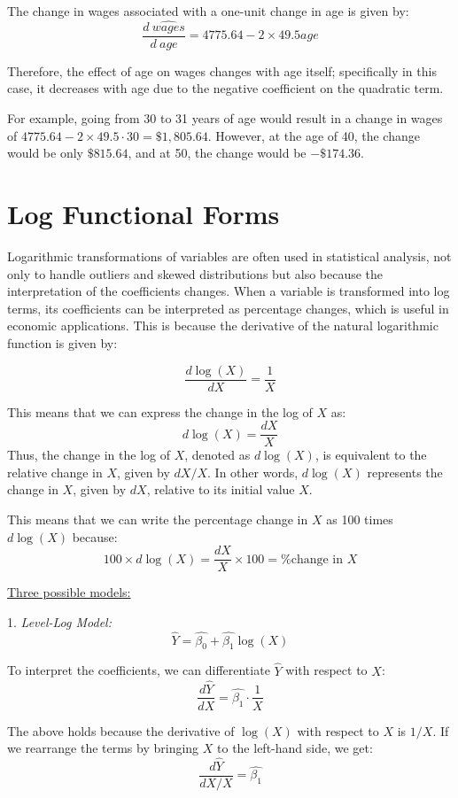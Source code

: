 \documentclass{./../../Latex/handout}
\begin{document}
The change in wages associated with a one-unit change in age is given by: $$ \frac{d \ \hat{wages}}{d \ age} = 4775.64 - 2 \times 49.5 age$$ 

Therefore, the effect of age on wages changes with age itself; specifically in this case, it decreases with age due to the negative coefficient on the quadratic term.

For example, going from 30 to 31 years of age would result in a change in wages of $4775.64 - 2 \times 49.5 \cdot 30 = \$1,805.64$. However, at the age of 40, the change would be only $\$815.64$, and at 50, the change would be $-\$174.36$.

 \section{Log Functional Forms}
 
 Logarithmic transformations of variables are often used in statistical analysis, not only to handle outliers and skewed distributions but also because the interpretation of the coefficients changes. When a variable is transformed into log terms, its coefficients can be interpreted as percentage changes, which is useful in economic applications. This is because the derivative of the natural logarithmic function is given by:
 
 $$ \frac{d \log(X)}{dX} = \frac{1}{X}$$
 
This means that we can express the change in the log of $X$ as: 
$$ d \log(X) = \frac{dX}{X} $$
Thus, the change in the log of $X$, denoted as $d\log(X)$, is equivalent to the relative change in $X$, given by $dX/X$. In other words, $d\log(X)$ represents the change in $X$, given by $dX$, relative to its initial value $X$.

This means that we can write the percentage change in $X$ as 100 times $d\log(X)$ because:
 $$ 100 \times d\log(X) = \frac{dX}{X}\times 100 = \text{\% change in $X$} $$
 
\underline{Three possible models:}

1. \textit{Level-Log Model:}
  $$\hat{Y} = \hat{\beta_0} +  \hat{\beta_1} \log(X)$$
  
To interpret the coefficients, we can differentiate $\hat{Y}$ with respect to $X$:
  $$ \frac{d \hat{Y} }{dX} = \hat{\beta_1} \cdot \frac{1}{X} $$
  
The above holds because the derivative of $\log(X)$ with respect to $X$ is $1/X$. If we rearrange the terms by bringing $X$ to the left-hand side, we get:
$$ \frac{d \hat{Y} }{dX/X} = \hat{\beta_1} $$
\end{document}
